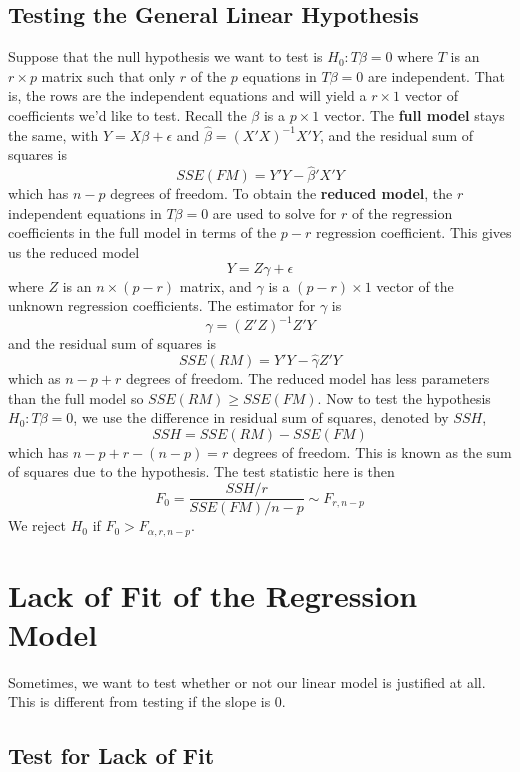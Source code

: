  \subsection{Testing the General Linear Hypothesis}

 Suppose that the null hypothesis we want to test is $H_0: T\beta = 0$ where $T$ is an $r \times p$ matrix such that only $r$ of the $p$ equations in $T\beta = 0$ are independent. That is, the rows are the independent equations and will yield a $r \times 1$ vector of coefficients we'd like to test. Recall the $\beta$ is a $p\times 1$ vector. The \textbf{full model} stays the same, with $Y = X\beta + \epsilon$ and $\hat{\beta} = (X'X)^{-1}X'Y$, and the residual sum of squares is 
 \[SSE(FM) = Y'Y - \hat{\beta}'X'Y\]
 which has $n-p$ degrees of freedom. To obtain the \textbf{reduced model}, the $r$ independent equations in $T\beta = 0$ are used to solve for $r$ of the regression coefficients in the full model in terms of the $p-r$ regression coefficient. This gives us the reduced model 
 \[Y = Z\gamma + \epsilon\]
 where $Z$ is an $n \times (p-r)$ matrix, and $\gamma$ is a $(p-r) \times 1$ vector of the unknown regression coefficients. The estimator for $\gamma$ is 
 \[\hat{\gamma} = (Z'Z)^{-1}Z'Y\]
 and the residual sum of squares is 
 \[SSE(RM) = Y'Y - \hat{\gamma}Z'Y\]
 which as $n - p + r$ degrees of freedom. The reduced model has less parameters than the full model so $SSE(RM) \geq SSE(FM)$. Now to test the hypothesis $H_0: T\beta = 0$, we use the difference in residual sum of squares, denoted by $SSH$,
 \[SSH = SSE(RM) - SSE(FM)\]
 which has $n-p + r - (n - p) = r$ degrees of freedom. This is known as the sum of squares due to the hypothesis. The test statistic here is then 
 \[F_0 = \frac{SSH/r}{SSE(FM)/n-p} \sim F_{r, n-p}\]
 We reject $H_0$ if $F_0 > F_{\alpha, r, n-p}$.\\

\section{Lack of Fit of the Regression Model}

Sometimes, we want to test whether or not our linear model is justified at all. This is different from testing if the slope is 0.

\subsection{Test for Lack of Fit}

